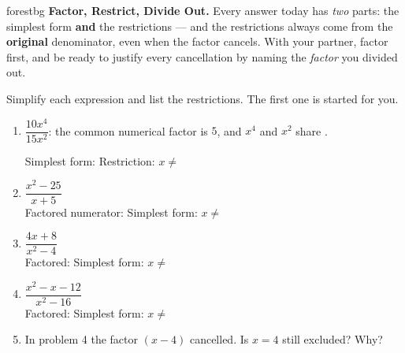 \documentclass[10pt]{article}
\begin{document}
\namepartnerperiod

\vspace{0.08in}

\begin{headlinebox}{forestbg}
\small\textbf{Factor, Restrict, Divide Out.} Every answer today has \emph{two} parts: the simplest
form \textbf{and} the restrictions --- and the restrictions always come from the \textbf{original}
denominator, even when the factor cancels. With your partner, factor first, and be ready to justify
every cancellation by naming the \emph{factor} you divided out.
\end{headlinebox}

\vspace{0.06in}

\begin{tcolorbox}[colback=white, colframe=black!40, title=\textbf{Tier R --- Remediate},
    fonttitle=\bfseries, arc=1.5mm, left=3mm, right=3mm, top=2mm, bottom=2mm, breakable]
Simplify each expression and list the restrictions. The first one is started for you.

\vspace{4pt}
\begin{enumerate}[leftmargin=1.9em, itemsep=9pt]
  \item $\dfrac{10x^4}{15x^2}$: \; the common numerical factor is $5$, and $x^4$ and $x^2$ share
        \blank{1.2cm}.

        Simplest form: \blank{2.2cm} \quad Restriction: $x\neq$ \blank{1.0cm}
  \item $\dfrac{x^2-25}{x+5}$ \\[3pt]
        Factored numerator: \blank{3.4cm} \quad Simplest form: \blank{2.0cm} \quad
        $x\neq$ \blank{1.2cm}
  \item $\dfrac{4x+8}{x^2-4}$ \\[3pt]
        Factored: \blank{4.0cm} \quad Simplest form: \blank{2.0cm} \quad
        $x\neq$ \blank{1.8cm}
  \item $\dfrac{x^2-x-12}{x^2-16}$ \\[3pt]
        Factored: \blank{4.4cm} \quad Simplest form: \blank{2.0cm} \quad
        $x\neq$ \blank{1.8cm}
  \item In problem 4 the factor $(x-4)$ cancelled. Is $x=4$ still excluded? \blank{1.2cm} \;
        Why? \blank{5.4cm}
\end{enumerate}
\end{tcolorbox}
\end{document}
